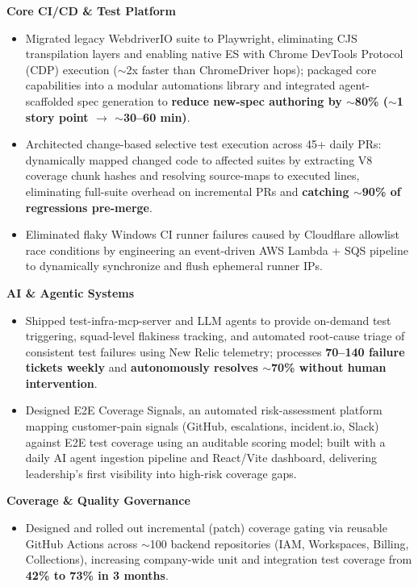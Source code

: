 \documentclass[9.5pt,a4paper]{article}
\newcommand{\resumeItem}[1]{
  \item\small{{#1}}
}
\begin{document}
  \vspace{1.5pt}
  \textbf{\small\color{darkink} Core CI/CD \& Test Platform}
  \begin{itemize}[leftmargin=12pt, topsep=1pt, itemsep=1.5pt, parsep=0pt]
    \resumeItem{Migrated legacy WebdriverIO suite to Playwright, eliminating CJS transpilation layers and enabling native ES with Chrome DevTools Protocol (CDP) execution ($\sim$2x faster than ChromeDriver hops); packaged core capabilities into a modular automations library and integrated agent-scaffolded spec generation to \textbf{reduce new-spec authoring by $\sim$80\% ($\sim$1 story point $\rightarrow$ $\sim$30--60 min)}.}
    \resumeItem{Architected change-based selective test execution across 45+ daily PRs: dynamically mapped changed code to affected suites by extracting V8 coverage chunk hashes and resolving source-maps to executed lines, eliminating full-suite overhead on incremental PRs and \textbf{catching $\sim$90\% of regressions pre-merge}.}
    \resumeItem{Eliminated flaky Windows CI runner failures caused by Cloudflare allowlist race conditions by engineering an event-driven AWS Lambda + SQS pipeline to dynamically synchronize and flush ephemeral runner IPs.}
  \end{itemize}

  \vspace{1.5pt}
  \textbf{\small\color{darkink} AI \& Agentic Systems}
  \begin{itemize}[leftmargin=12pt, topsep=1pt, itemsep=1.5pt, parsep=0pt]
    \resumeItem{Shipped test-infra-mcp-server and LLM agents to provide on-demand test triggering, squad-level flakiness tracking, and automated root-cause triage of consistent test failures using New Relic telemetry; processes \textbf{70--140 failure tickets weekly} and \textbf{autonomously resolves $\sim$70\% without human intervention}.}
    \resumeItem{Designed E2E Coverage Signals, an automated risk-assessment platform mapping customer-pain signals (GitHub, escalations, incident.io, Slack) against E2E test coverage using an auditable scoring model; built with a daily AI agent ingestion pipeline and React/Vite dashboard, delivering leadership's first visibility into high-risk coverage gaps.}
  \end{itemize}

  \vspace{1.5pt}
  \textbf{\small\color{darkink} Coverage \& Quality Governance}
  \begin{itemize}[leftmargin=12pt, topsep=1pt, itemsep=1.5pt, parsep=0pt]
    \resumeItem{Designed and rolled out incremental (patch) coverage gating via reusable GitHub Actions across $\sim$100 backend repositories (IAM, Workspaces, Billing, Collections), increasing company-wide unit and integration test coverage from \textbf{42\% to 73\% in 3 months}.}
  \end{itemize}
\end{document}
